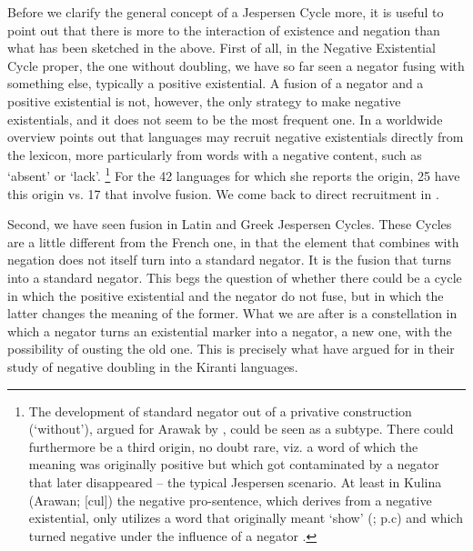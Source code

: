 ﻿\documentclass[output=paper]{langsci/langscibook}
\begin{document}
Before we clarify the general concept of a Jespersen Cycle more, it is
useful to point out that there is more to the interaction of existence and
negation than what has been sketched in the above. First of all, in the
Negative Existential Cycle proper, the one without doubling, we have so far
seen a negator fusing with something else, typically a positive
existential. A fusion of a negator and a positive existential is not,
however, the only strategy to make negative existentials, and it does not
seem to be the most frequent one. In a worldwide overview
\textcite[137]{Veselinova2013} points out that languages may recruit
negative existentials directly from the lexicon, more particularly from
words with a negative content, such as `absent' or `lack'.%
%
\footnote{The
development of standard negator out of a privative construction
(`without'), argued for Arawak by \textcite[285--288]{Michael2014}, could be
seen as a subtype. There could furthermore be a third origin, no doubt
rare, viz. a word of which the meaning was originally positive but which
got contaminated by a negator that later disappeared -- the typical
Jespersen scenario. At least in Kulina (Arawan; [cul]) the negative
pro-sentence, which derives from a negative existential, only utilizes a
word that originally meant `show' (\citealt[236]{Dienst2014}; p.c) and
which turned negative under the influence of a negator
\parencite{KrasnoukhovaAuweraXXXX}.} %
%
For the 42 languages for which she reports the
origin, 25 have this origin vs. 17 that involve fusion. We come back to
direct recruitment in .

Second, we have seen fusion in Latin and Greek Jespersen Cycles. These
Cycles are a little different from the French one, in that the element that
combines with negation does not itself turn into a standard negator. It is
the fusion that turns into a standard negator. This begs the question of
whether there could be a cycle in which the positive existential and the
negator do not fuse, but in which the latter changes the meaning of the
former. What we are after is a constellation in which a negator turns an
existential marker into a negator, a new one, with the possibility of
ousting the old one. This is precisely what 
\textcite{AuweraVossen2017} have argued for in their study of negative
doubling in the Kiranti languages.
\end{document}
